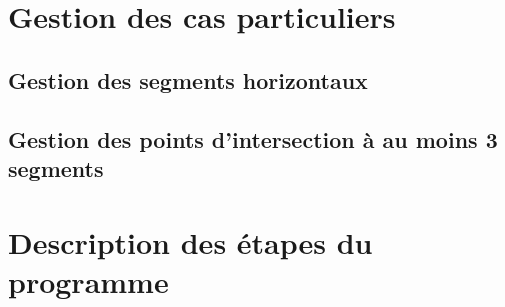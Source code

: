 \documentclass[]{article}
\begin{document}
\section{Gestion des cas particuliers}\label{sec:part}
    \subsection{Gestion des segments horizontaux}\label{sub:horiz}
    
    \subsection{Gestion des points d'intersection à au moins 3 segments}\label{sub:interSeg}

\section{Description des étapes du programme}\label{sec:prog}
\end{document}
